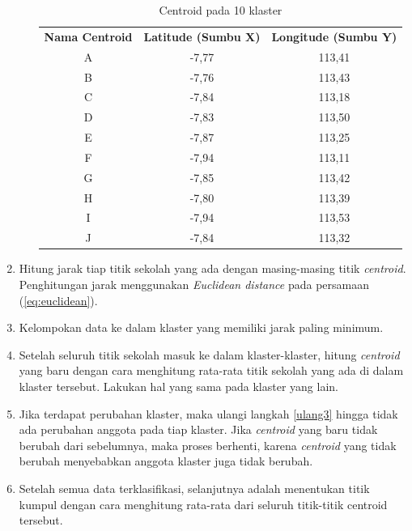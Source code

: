 \begin{enumerate}
\begin{enumerate}
\begin{table}[H]
\centering
\footnotesize
\begin{tabular}{ccc}
\rowcolor[HTML]{4472C4} 
{\color[HTML]{FFFFFF} \textbf{Nama   Centroid}} & {\color[HTML]{FFFFFF} \textbf{Latitude (Sumbu X)}} & {\color[HTML]{FFFFFF} \textbf{Longitude (Sumbu Y)}} \\
\rowcolor[HTML]{D9E1F2} 
A & -7,77 & 113,41 \\
B & -7,76 & 113,43 \\
\rowcolor[HTML]{D9E1F2} 
C & -7,84 & 113,18 \\
D & -7,83 & 113,50 \\
\rowcolor[HTML]{D9E1F2} 
E & -7,87 & 113,25 \\
F & -7,94 & 113,11 \\
\rowcolor[HTML]{D9E1F2} 
G & -7,85 & 113,42 \\
H & -7,80 & 113,39 \\
\rowcolor[HTML]{D9E1F2} 
I & -7,94 & 113,53 \\
J & -7,84 & 113,32
\end{tabular}
\caption{Centroid pada 10 klaster}
\label{tab:center10}
\end{table}

		
	\end{enumerate}

	\item \label{ulang3} Hitung jarak tiap titik sekolah yang ada dengan masing-masing titik \textit{centroid}. Penghitungan jarak menggunakan \textit{Euclidean distance} pada persamaan (\ref{eq:euclidean}).
	
	\item Kelompokan data ke dalam klaster yang memiliki jarak paling minimum.
	\item Setelah seluruh titik sekolah masuk ke dalam klaster-klaster, hitung \textit{centroid} yang baru dengan cara menghitung rata-rata titik sekolah yang ada di dalam klaster tersebut. Lakukan hal yang sama pada klaster yang lain.
	\item Jika terdapat perubahan klaster, maka ulangi langkah \ref{ulang3} hingga tidak ada perubahan anggota pada tiap klaster. Jika \textit{centroid} yang baru tidak berubah dari sebelumnya, maka proses berhenti, karena \textit{centroid} yang tidak berubah menyebabkan anggota klaster juga tidak berubah.
	
	\item Setelah semua data terklasifikasi, selanjutnya adalah menentukan titik kumpul dengan cara menghitung rata-rata dari seluruh titik-titik centroid tersebut.
\end{enumerate}

